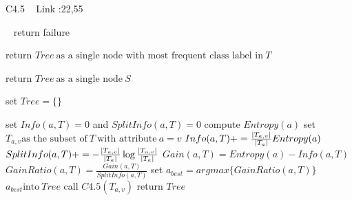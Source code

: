 \documentclass[a4paper]{article}
\begin{document}
 \begin{algorithm}
 
   \caption{C4.5  ~\cite{c4.5} Link :22,55 }
    \begin{algorithmic}[1]
     \
      \State return failure
      \EndIf
      
      \State return $Tree \  \text{as a single node with most frequent class label in}\  T$ 
      \EndIf
     
      \State return $Tree \  \text{as a single node}\  S $ 
      \EndIf
      
   \State set $Tree = \{\}$
   
       \State set $Info(a,T) = 0$  and $SplitInfo(a,T) = 0$
       \State compute $Entropy(a)$
       \State set $T_{a,v}  \text{as the subset of} \  T \  \text{with attribute}\ a = v$  
       \State  $Info(a,T) + = \frac{\abs{T_{a,v}}}{\abs{T_{a}}} Entropy(a)$
       \State $SplitInfo(a,T)+= - \frac{\abs{T_{a,v}}}{\abs{T_{a}}} \log \frac{\abs{T_{a,v}}}{\abs{T_{a}}} $
          \EndFor
          \State $Gain(a,T) = Entropy(a) - Info(a,T)$
          \State  $GainRatio(a,T) = \frac{Gain(a,T)}{SplitInfo(a,T)}$
          \EndFor
       \State set $a_{best} = argmax \{GainRatio(a,T)\}$
       \State $a_{best} \text{into} \  Tree$
       call $C4.5(T_{a,v})$
        \EndFor
        \State return $Tree$
        
  \EndFunction
  

\end{algorithmic}
\end{algorithm}
\end{document}
